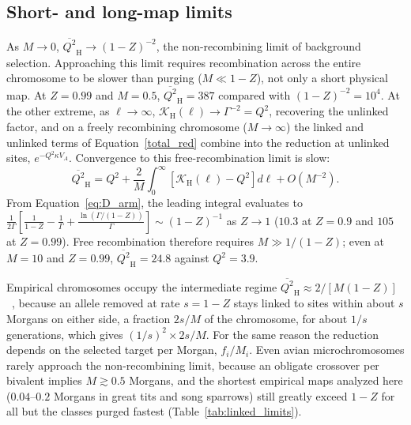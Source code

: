 \documentclass{article}
\begin{document}
\subsection{Short- and long-map limits}\label{app:D_limits}
As $M \to 0$, $\overline{Q^2}_\text{H} \to (1-Z)^{-2}$, the non-recombining limit of background selection. Approaching this limit requires recombination across the entire chromosome to be slower than purging ($M \ll 1 - Z$), not only a short physical map. At $Z = 0.99$ and $M = 0.5$, $\overline{Q^2}_\text{H} = 387$ compared with $(1-Z)^{-2} = 10^4$. At the other extreme, as $\ell \to \infty$, $\mathcal{K}_\text{H}(\ell) \to \Gamma^{-2} = Q^2$, recovering the unlinked factor, and on a freely recombining chromosome ($M \to \infty$) the linked and unlinked terms of Equation~\eqref{total_red} combine into the reduction at unlinked sites, $e^{-Q^2\kappa V_A}$. Convergence to this free-recombination limit is slow:
\begin{equation}
    \overline{Q^2}_\text{H} = Q^2 + \frac{2}{M}\int_0^\infty \left[\mathcal{K}_\text{H}(\ell) - Q^2\right]d\ell + O(M^{-2}).
\end{equation}
From Equation~\eqref{eq:D_arm}, the leading integral evaluates to $\frac{1}{2\Gamma}\left[\frac{1}{1-Z} - \frac{1}{\Gamma} + \frac{\ln(\Gamma/(1-Z))}{\Gamma}\right] \sim (1-Z)^{-1}$ as $Z \to 1$ ($10.3$ at $Z = 0.9$ and $105$ at $Z = 0.99$). Free recombination therefore requires $M \gg 1/(1-Z)$; even at $M = 10$ and $Z = 0.99$, $\overline{Q^2}_\text{H} = 24.8$ against $Q^2 = 3.9$.

Empirical chromosomes occupy the intermediate regime $\overline{Q^2}_\text{H} \approx 2/[M(1-Z)]$~\cite{santiago1998}, because an allele removed at rate $s = 1 - Z$ stays linked to sites within about $s$ Morgans on either side, a fraction $2s/M$ of the chromosome, for about $1/s$ generations, which gives $(1/s)^2 \times 2s/M$. For the same reason the reduction depends on the selected target per Morgan, $f_i/M_i$. Even avian microchromosomes rarely approach the non-recombining limit, because an obligate crossover per bivalent implies $M \gtrsim 0.5$ Morgans, and the shortest empirical maps analyzed here ($0.04$--$0.2$ Morgans in great tits and song sparrows) still greatly exceed $1 - Z$ for all but the classes purged fastest (Table~\ref{tab:linked_limits}).
\end{document}
